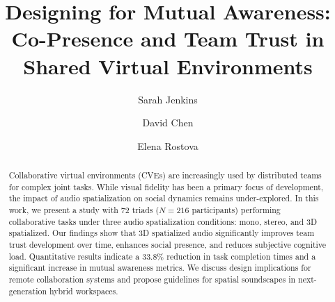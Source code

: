 \documentclass[manuscript,review,anonymous]{acmart}
\begin{document}
\title{Designing for Mutual Awareness: Co-Presence and Team Trust in Shared Virtual
Environments}

\author{Sarah Jenkins}

\author{David Chen}

\author{Elena Rostova}

\renewcommand{\shortauthors}{Jenkins et al.}

\begin{abstract}
Collaborative virtual environments (CVEs) are increasingly used by distributed teams for
complex joint tasks. While visual fidelity has been a primary focus of development, the
impact of audio spatialization on social dynamics remains under-explored. In this work, we
present a study with 72 triads ($N = 216$ participants) performing collaborative tasks under
three audio spatialization conditions: mono, stereo, and 3D spatialized. Our findings show
that 3D spatialized audio significantly improves team trust development over time, enhances
social presence, and reduces subjective cognitive load. Quantitative results indicate a
33.8\% reduction in task completion times and a significant increase in mutual awareness
metrics. We discuss design implications for remote collaboration systems and propose
guidelines for spatial soundscapes in next-generation hybrid workspaces.
\end{abstract}



\maketitle

\noindent{}











\end{document}
